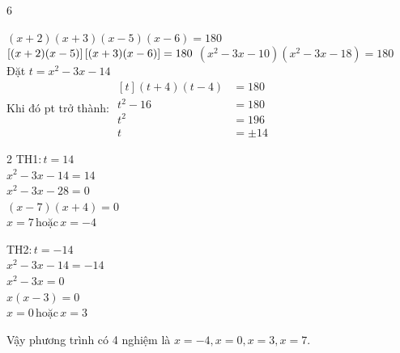 \begin{Solbook}{6}
 \par \noindent  $(x+2)(x+3)(x-5)(x-6)=180$ \\ $\left [(x+2)(x-5)\right ]\left [(x+3)(x-6)\right ]=180\\$ $(x^2-3x-10)(x^2-3x-18)=180$\\ Đặt $t=x^2-3x-14$\\ Khi đó pt trở thành: \( \begin {aligned}[t] (t+4)(t-4)&=180\\ t^2-16&=180\\ t^2&=196\\ t&=\pm 14 \end {aligned} \) \begin {multicols}{2} TH1:\,$t=14$\\ $x^2-3x-14=14$\\ $x^2-3x-28=0$\\ $(x-7)(x+4)=0$\\ $x=7\, \text {hoặc}\, x=-4$ \par \columnbreak \par TH2:\,$t=-14$\\ $x^2-3x-14=-14$\\ $x^2-3x=0$\\ $x(x-3)=0$\\ $x=0\, \text {hoặc}\, x=3$ \end {multicols} Vậy phương trình có 4 nghiệm là $x=-4,x=0,x=3,x=7$.  \hfill \qedEX 
\end{Solbook}

